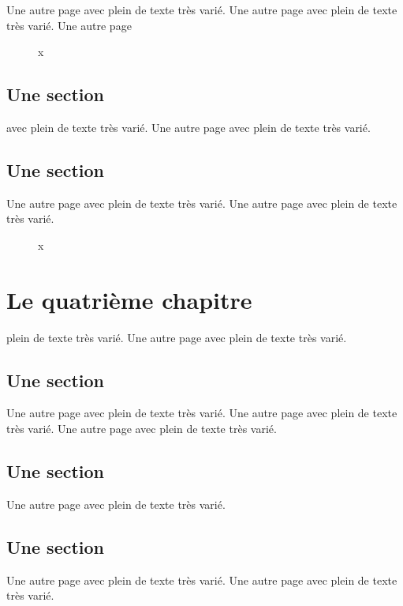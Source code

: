 \documentclass[11pt]{thesul}
\begin{document}
Une autre page avec plein de texte très varié.
Une autre page avec plein de texte très varié.
Une autre page


\begin{figure}[htb]
\caption{x\label{toutou}}
\end{figure}

\section{Une section}

avec plein de texte très varié.
Une autre page avec plein de texte très varié.

\section{Une section}

Une autre page avec plein de texte très varié.
Une autre page avec plein de texte très varié.

\begin{figure}[htb]
\caption{x}
\end{figure}

\chapter{Le quatri\`eme chapitre}

plein de texte très varié.
Une autre page avec plein de texte très varié.

\section{Une section}

Une autre page avec plein de texte très varié.
Une autre page avec plein de texte très varié.
Une autre page avec plein de texte très varié.

\section{Une section}

Une autre page avec plein de texte très varié.

\section{Une section}

Une autre page avec plein de texte très varié.
Une autre page avec plein de texte très varié.
\end{document}
